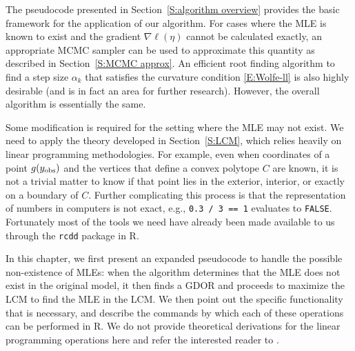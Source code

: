 The pseudocode presented in Section~\ref{S:algorithm overview} provides the 
basic framework for the application of our algorithm.
For cases where the MLE is known to exist and  the gradient $\nabla \ell(\eta)$  
cannot be calculated exactly, an appropriate MCMC sampler can be used to 
approximate this quantity as described in Section~\ref{S:MCMC approx}.  
An efficient root finding algorithm to find a step size $\alpha_k$ that satisfies the 
curvature condition \eqref{E:Wolfe-ll} is also highly desirable (and is in fact
an area for further research).  However, the overall algorithm
is essentially the same.

Some modification is required for the setting where the MLE may not exist.  
We need to apply the theory developed in Section~\ref{S:LCM}, which
relies heavily on linear programming methodologies.  For example, even when coordinates 
of a point $g(y_{\text{obs}})$ and the vertices that define a convex polytope $C$ are known, it 
is not a trivial matter to know if that point lies in the exterior, interior, 
or exactly on a boundary of $C$.  
Further complicating this process is that the representation of 
numbers in computers is not exact, e.g., \texttt{0.3 / 3 == 1} evaluates
to \texttt{FALSE}.  Fortunately most of the tools we need have already 
been made available to us through the \texttt{rcdd} package \citep{rcdd:R} in R.  

In this chapter, we first present an expanded pseudocode to handle the possible
non-existence of MLEs: when the algorithm determines that the MLE does not exist
in the original model, it then finds a GDOR and proceeds to maximize the LCM to
find the MLE in the LCM.  
We then point out the specific functionality that is necessary,
and describe the commands by which each of these operations can be performed in R.
We do not provide theoretical derivations for the linear programming operations here
and refer the interested reader to \citep{Fukuda:2004,Fukuda:2008}.

\newpage
